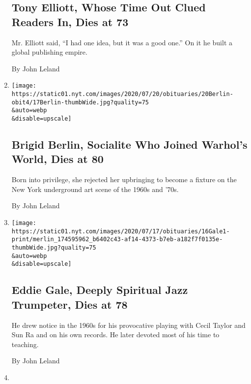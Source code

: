 \begin{enumerate}
{  \subsection{Tony Elliott, Whose Time Out Clued Readers In, Dies at
  73}\label{tony-elliott-whose-time-out-clued-readers-in-dies-at-73}}

  Mr. Elliott said, ``I had one idea, but it was a good one.'' On it he
  built a global publishing empire.

  By John Leland
\item
  \href{/2020/07/18/arts/brigid-berlin-dead.html}{}

  \texttt{[image: https://static01.nyt.com/images/2020/07/20/obituaries/20Berlin-obit4/17Berlin-thumbWide.jpg?quality=75\\\&auto=webp\\\&disable=upscale]}

  \hypertarget{brigid-berlin-socialite-who-joined-warhols-world-dies-at-80}{%
  \subsection{Brigid Berlin, Socialite Who Joined Warhol's World, Dies
  at
  80}\label{brigid-berlin-socialite-who-joined-warhols-world-dies-at-80}}

  Born into privilege, she rejected her upbringing to become a fixture
  on the New York underground art scene of the 1960s and '70s.

  By John Leland
\item
  \href{/2020/07/16/arts/music/eddie-gale-dead.html}{}

  \texttt{[image: https://static01.nyt.com/images/2020/07/17/obituaries/16Gale1-print/merlin\_174595962\_b6402c43-af14-4373-b7eb-a182f7f0135e-thumbWide.jpg?quality=75\\\&auto=webp\\\&disable=upscale]}

  \hypertarget{eddie-gale-deeply-spiritual-jazz-trumpeter-dies-at-78}{%
  \subsection{Eddie Gale, Deeply Spiritual Jazz Trumpeter, Dies at
  78}\label{eddie-gale-deeply-spiritual-jazz-trumpeter-dies-at-78}}

  He drew notice in the 1960s for his provocative playing with Cecil
  Taylor and Sun Ra and on his own records. He later devoted most of his
  time to teaching.

  By John Leland
\item
  \href{/2020/07/15/us/vickey-gibbs-dead-coronavirus.html}{}


\end{enumerate}
